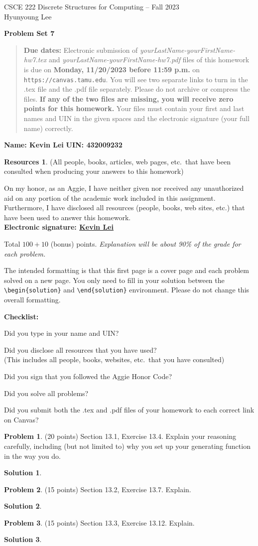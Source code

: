 \documentclass{article}
\theoremstyle{definition}
\newtheorem{problem}{Problem}
\newtheorem*{solution}{Solution}
\newtheorem*{resources}{Resources}
\newcommand{\name}[2]{\noindent\textbf{Name: #1}\hfill \textbf{UIN: #2}
  \newcommand{\myName}{#1}
  \newcommand{\myUIN}{#2}
}
\newcommand{\honor}{\noindent On my honor, as an Aggie, I have neither
  given nor received any unauthorized aid on any portion of the
  academic work included in this assignment. Furthermore, I have
  disclosed all resources (people, books, web sites, etc.) that have
  been used to answer this homework. \\[2ex]
 \textbf{Electronic signature: \underline{ Kevin Lei } } } %
\newcommand{\checklist}{\noindent\textbf{Checklist:}
\begin{compactitem}[$\Box$] 
\item Did you type in your name and UIN? 
\item Did you disclose all resources that you have used? \\
(This includes all people, books, websites, etc.\ that you have consulted)
\item Did you sign that you followed the Aggie Honor Code? 
\item Did you solve all problems? 
\item Did you submit both the .tex and .pdf files of your homework to each correct link 
on Canvas? 
\end{compactitem}
}
\newcommand{\problemset}[1]{\begin{center}\textbf{Problem Set #1}\end{center}}
\newcommand{\duedate}[1]{\begin{quote}\textbf{Due dates:} Electronic
    submission of \textsl{yourLastName-yourFirstName-hw7.tex} and 
    \textsl{yourLastName-yourFirstName-hw7.pdf} files of this homework is due on
    \textbf{#1} on \texttt{https://canvas.tamu.edu}. You will see two separate links
    to turn in the .tex file and the .pdf file separately. Please do not archive or compress the files.  
    \textbf{If any of the two files are missing, you will receive zero points for this homework.}
    Your files must contain your first and last names and UIN in the given spaces and 
    the electronic signature (your full name) correctly.\end{quote} }
\begin{document}
\begin{center}
{\large
CSCE 222 Discrete Structures for Computing -- Fall 2023\\[.5ex]
Hyunyoung Lee\\}
\end{center}
\problemset{7}
\duedate{Monday, 11/20/2023 before 11:59 p.m.}
\name{ Kevin Lei }{ 432009232 } %

\begin{resources} (All people, books, articles, web pages, etc.\ that
  have been consulted when producing your answers to this homework)
\end{resources}
\honor

\bigskip

\noindent
Total $100+10$ (bonus) points.  \textit{Explanation will be about 90\% of the grade 
for each problem.}

\bigskip

\noindent
The intended formatting is that this first page is a cover page and each 
problem solved on a new page. You only need to fill in your solution between 
the \verb|\begin{solution}| and \verb|\end{solution}| environment.  
Please do not change this overall formatting.

\vfill
\checklist

\newpage
\begin{problem} (20 points) Section 13.1, Exercise 13.4. Explain your reasoning 
carefully, including (but not limited to) why you set up your generating function 
in the way you do.
\end{problem}
\begin{solution}

\end{solution}

\newpage
\begin{problem} (15 points) Section 13.2, Exercise 13.7. Explain.
\end{problem}
\begin{solution}
\end{solution}

\newpage
\begin{problem} (15 points) Section 13.3, Exercise 13.12. Explain.
\end{problem}
\begin{solution}
\end{solution}
\end{document}
